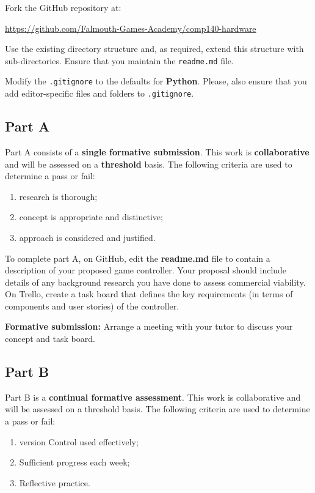 \documentclass{../fal_assignment}
\begin{document}
Fork the GitHub repository at:

\indent \url{https://github.com/Falmouth-Games-Academy/comp140-hardware }

Use the existing directory structure and, as required, extend this structure with sub-directories. Ensure that you maintain the \texttt{readme.md} file.

Modify the \texttt{.gitignore} to the defaults for \textbf{Python}. Please, also ensure that you add editor-specific files and folders to \texttt{.gitignore}. 

\subsection*{Part A}

Part A consists of a \textbf{single formative submission}. This work is \textbf{collaborative} and will be assessed on a \textbf{threshold} basis. The following criteria are used to determine a pass or fail:

\begin{enumerate}[label=(\alph*)]
	\item research is thorough;
	\item concept is appropriate and distinctive;
	\item approach is considered and justified.
\end{enumerate}

To complete part A, on GitHub, edit the \textbf{readme.md} file to contain a description of your proposed game controller. Your proposal should include details of any background research you have done to assess commercial viability. On Trello, create a task board that defines the key requirements (in terms of components and user stories) of the controller. 

\textbf{Formative submission:} Arrange a meeting with your tutor to discuss your concept and task board. 

\subsection*{Part B}

Part B is a \textbf{continual formative assessment}. This work is collaborative and will be assessed on a threshold basis. The following criteria are used to determine a pass or fail:

\begin{enumerate}[label=(\alph*)]
	\item version Control used effectively;
	\item Sufficient progress each week;
	\item Reflective practice.
\end{enumerate}
\end{document}
